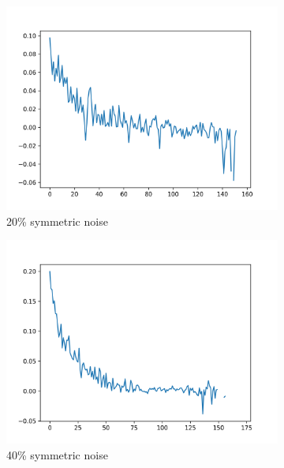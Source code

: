 \documentclass{article}
\begin{document}
\begin{figure}[h]
    \centering
    \begin{subfigure}[b]{0.22\textwidth}
        \includegraphics[width=\textwidth]{figs/Dense100_20_plot.png}
        \vspace{-.5cm}
        \caption{20\% symmetric noise}
    \end{subfigure}
    \begin{subfigure}[b]{0.22\textwidth}
        \includegraphics[width=\textwidth]{figs/Dense100_40_plot.png}
        \vspace{-.5cm}
        \caption{40\% symmetric noise}
    \end{subfigure}
    \begin{subfigure}[b]{0.22\textwidth}

\end{subfigure}
\end{figure}
\end{document}
